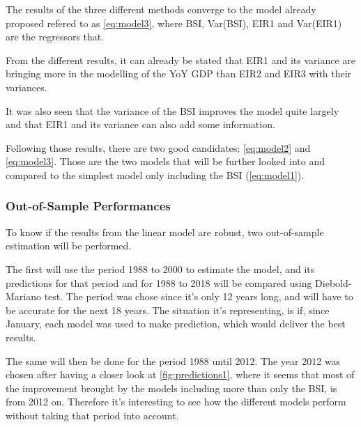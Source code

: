 \documentclass[12pt,a4paper,oneside]{book}
\begin{document}
The results of the three different methods converge to the model already proposed refered to as \ref{eq:model3}, where BSI, Var(BSI), EIR1 and Var(EIR1) are the regressors that.

From the different results, it can already be stated that EIR1 and its variance are bringing more in the modelling of the YoY GDP than EIR2 and EIR3 with their variances.

It was also seen that the variance of the BSI improves the model quite largely and that EIR1 and its variance can also add some information.

Following those results, there are two good candidates; \autoref{eq:model2} and \ref{eq:model3}. Those are the two models that will be further looked into and compared to the simplest model only including the BSI (\autoref{eq:model1}).



\subsubsection{Out-of-Sample Performances}

To know if the results from the linear model are robust, two out-of-sample estimation will be performed.

The first will use the period 1988 to 2000 to estimate the model, and its predictions for that period and for 1988 to 2018 will be compared using Diebold-Mariano test.
The period was chose since it's only 12 years long, and will have to be accurate for the next 18 years. The situation it's representing, is if, since January, each model was used to make prediction, which would deliver the best results.

The same will then be done for the period 1988 until 2012. The year 2012 was chosen after having a closer look at \autoref{fig:predictions1}, where it seems that most of the improvement brought by the models including more than only the BSI, is from 2012 on. Therefore it's interesting to see how the different models perform without taking that period into account.

\end{document}
